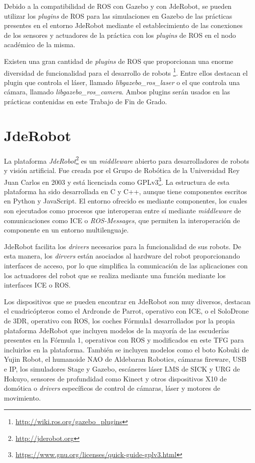 Debido a la compatibilidad de ROS con Gazebo y con JdeRobot, se pueden utilizar los \textit{plugins} de ROS para las simulaciones en Gazebo de las prácticas presentes en el entorno JdeRobot mediante el establecimiento de las conexiones de los sensores y actuadores de la práctica con los \textit{plugins} de ROS en el nodo académico de la misma.

Existen una gran cantidad de \textit{plugins} de ROS que proporcionan una enorme diversidad de funcionalidad para el desarrollo de robots \footnote{\url{http://wiki.ros.org/gazebo_plugins}}. Entre ellos destacan el plugin que controla el láser, llamado \textit{libgazebo\_ros\_laser} o el que controla una cámara, llamado \textit{libgazebo\_ros\_camera}. Ambos plugins serán usados en las prácticas contenidas en este Trabajo de Fin de Grado.

\section{JdeRobot}
La plataforma \textit{JdeRobot}\footnote{\url{http://jderobot.org}} es un \textit{middleware} abierto para desarrolladores de robots y visión artificial. Fue creada por el Grupo de Robótica de la Universidad Rey Juan Carlos en 2003 y está licenciada como GPLv3\footnote{\url{https://www.gnu.org/licenses/quick-guide-gplv3.html}}.
La estructura de esta plataforma ha sido desarrollada en C y C++, aunque tiene componentes escritos en Python y JavaScript. El entorno ofrecido es mediante componentes, los cuales son ejecutados como procesos que interoperan entre sí mediante \textit{middleware} de comunicaciones como ICE o \textit{ROS-Messages}, que permiten la interoperación de componente en un entorno multilenguaje.

JdeRobot facilita los \textit{drivers} necesarios para la funcionalidad de sus robots. De esta manera, los \textit{dirvers} están asociados al hardware del robot proporcionando interfaces de acceso, por lo que simplifica la comunicación de las aplicaciones con los actuadores del robot que se realiza mediante una función mediante los interfaces ICE o ROS.

Los dispositivos que se pueden encontrar en JdeRobot son muy diversos, destacan el cuadricópteros como el Ardronde de Parrot, operativo con ICE, o el SoloDrone de 3DR, operativo con ROS, los coches Fórmula1 desarrollados por la propia plataforma JdeRobot que incluyen modelos de la mayoría de las escuderías presentes en la Fórmula 1, operativos con ROS y modificados en este TFG para incluirlos en la plataforma. También se incluyen modelos como el boto Kobuki de Yujin Robot, el humanoide NAO de Aldebaran Robotics, cámaras fireware, USB e IP, los simuladores Stage y Gazebo, escáneres láser LMS de SICK y URG de Hokuyo, sensores de profundidad como Kinect y otros dispositivos X10 de domótica o \textit{drivers} específicos de control de cámaras, láser y motores de movimiento.

